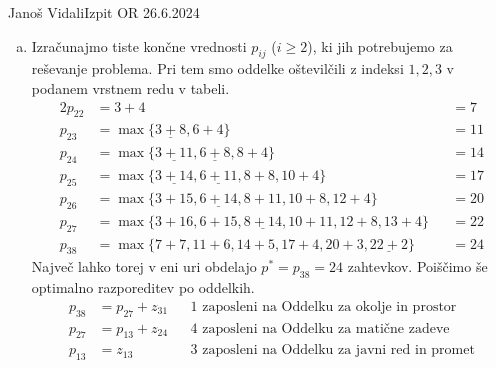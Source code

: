 \begin{naloga}{Janoš Vidali}{Izpit OR 26.6.2024}
\begin{odgovor}
\begin{enumerate}[(a)]
\item Izračunajmo tiste končne vrednosti $p_{ij}$ ($i \ge 2$),
ki jih potrebujemo za reševanje problema.
Pri tem smo oddelke oštevilčili z indeksi $1, 2, 3$
v podanem vrstnem redu v tabeli.
\begin{alignat*}{2}
p_{22} &= 3+4 &&= 7 \\
p_{23} &= \max\{\underline{3+8}, 6+4\} &&= 11 \\
p_{24} &= \max\{\underline{3+11}, \underline{6+8}, 8+4\} &&= 14 \\
p_{25} &= \max\{\underline{3+14}, \underline{6+11}, 8+8, 10+4\} &&= 17 \\
p_{26} &= \max\{3+15, \underline{6+14}, 8+11, 10+8, 12+4\} &&= 20 \\
p_{27} &= \max\{3+16, 6+15, \underline{8+14}, 10+11, 12+8, 13+4\} &&= 22 \\
p_{38} &= \max\{7+7, 11+6, 14+5, 17+4, 20+3, \underline{22+2}\} &&= 24
\end{alignat*}
Največ lahko torej v eni uri obdelajo $p^* = p_{38} = 24$ zahtevkov.
Poiščimo še optimalno razporeditev po oddelkih.
\begin{align*}
p_{38} &= p_{27} + z_{31} && \text{$1$ zaposleni na Oddelku za okolje in prostor} \\
p_{27} &= p_{13} + z_{24} && \text{$4$ zaposleni na Oddelku za matične zadeve} \\
p_{13} &= z_{13}          && \text{$3$ zaposleni na Oddelku za javni red in promet}
\end{align*}
\end{enumerate}
\end{odgovor}
\end{naloga}
